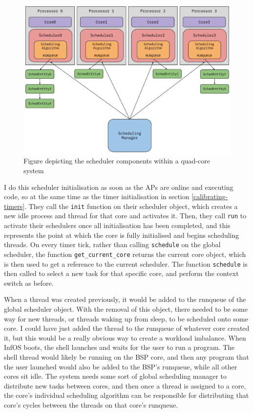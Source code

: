 \documentclass[bsc,frontabs,singlespacing,parskip,deptreport]{infthesis}
\begin{document}
\begin{figure}[t!]
    \centering
    \includegraphics[width=\textwidth]{figures/multicore-schedulers.pdf}
    \caption{Figure depicting the scheduler components within a quad-core system}
    \label{multicore-schedulers}
\end{figure}

I do this scheduler initialisation as soon as the APs are online and executing code, so at the same time as the timer initialisation in section \ref{calibrating-timers}. They call the \verb|init| function on their scheduler object, which creates a new idle process and thread for that core and activates it. Then, they call \verb|run| to activate their schedulers once all initialisation has been completed, and this represents the point at which the core is fully initialised and begins scheduling threads. On every timer tick, rather than calling \verb|schedule| on the global scheduler, the function \verb|get_current_core| returns the current core object, which is then used to get a reference to the current scheduler. The function \verb|schedule| is then called to select a new task for that specific core, and perform the context switch as before.

When a thread was created previously, it would be added to the runqueue of the global scheduler object. With the removal of this object, there needed to be some way for new threads, or threads waking up from sleep, to be scheduled onto some core. I could have just added the thread to the runqueue of whatever core created it, but this would be a really obvious way to create a workload imbalance. When InfOS boots, the shell launches and waits for the user to run a program. The shell thread would likely be running on the BSP core, and then any program that the user launched would also be added to the BSP's runqueue, while all other cores sit idle. The system needs some sort of global scheduling manager to distribute new tasks between cores, and then once a thread is assigned to a core, the core's individual scheduling algorithm can be responsible for distributing that core's cycles between the threads on that core's runqueue.
\end{document}

